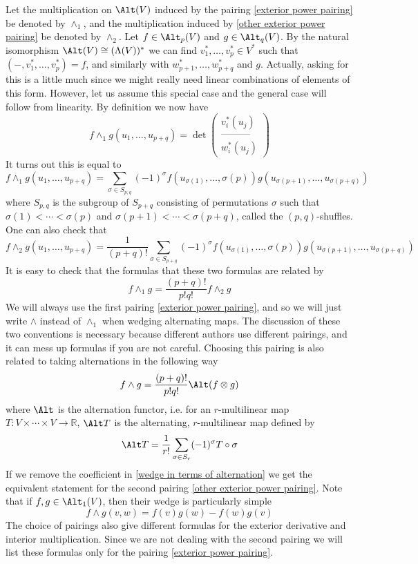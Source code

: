 Let the multiplication on $\Alt(V)$ induced by the pairing \eqref{exterior power pairing} be denoted by $\wedge_1$, and the multiplication induced by \eqref{other exterior power pairing} be denoted by $\wedge_2$. Let $f \in \Alt_p(V)$ and $g \in \Alt_q(V)$. By the natural isomorphism $\Alt(V) \cong (\Lambda(V))^*$ we can find $v_1^*,\ldots,v_p^* \in V^*$ such that $(-,v_1^*,\ldots,v_p^*) = f$, and similarly with $w_{p+1}^*,\ldots,w_{p+q}^*$ and $g$. Actually, asking for this is a little much since we might really need linear combinations of elements of this form. However, let us assume this special case and the general case will follow from linearity. By definition we now have
\[ f \wedge_1 g(u_1,\ldots,u_{p+q}) = \det\left( \begin{array}{c} v_i^*(u_j) \\ \text{---------} \\ w_i^*(u_j) \end{array} \right) \]
It turns out this is equal to 
\[ f \wedge_1 g(u_1,\ldots,u_{p+q}) = \sum_{\sigma \in S_{p,q}} (-1)^\sigma f(u_{\sigma(1)},\ldots,\sigma(p)) g(u_{\sigma(p+1)},\ldots,u_{\sigma(p+q)}) \]
where $S_{p,q}$ is the subgroup of $S_{p+q}$ consisting of permutations $\sigma$ such that $\sigma(1)<\cdots<\sigma(p)$ and $\sigma(p+1)<\cdots<\sigma(p+q)$, called the $(p,q)$-shuffles. One can also check that
\[ f \wedge_2 g(u_1,\ldots,u_{p+q}) = \frac{1}{(p+q)!} \sum_{\sigma \in S_{p+q}} (-1)^\sigma f(u_{\sigma(1)},\ldots,\sigma(p)) g(u_{\sigma(p+1)},\ldots,u_{\sigma(p+q)}) \]
It is easy to check that the formulas that these two formulas are related by
\[ f \wedge_1 g = \frac{(p+q)!}{p! q!} f \wedge_2 g \]
We will always use the first pairing \eqref{exterior power pairing}, and so we will just write $\wedge$ instead of $\wedge_1$ when wedging alternating maps. The discussion of these two conventions is necessary because different authors use different pairings, and it can mess up formulas if you are not careful. Choosing this pairing is also related to taking alternations in the following way
\begin{equation}
\label{wedge in terms of alternation}
f \wedge g = \frac{(p+q)!}{p!q!} \Alt(f \otimes g)
\end{equation}
where $\Alt$ is the alternation functor, i.e. for an $r$-multilinear map $T : V \times \cdots \times V \rightarrow \mathbb R$, $\Alt T$ is the alternating, $r$-multilinear map defined by
\[ \Alt T = \frac{1}{r!} \sum_{\sigma \in S_r} (-1)^\sigma T \circ \sigma \]
If we remove the coefficient in \eqref{wedge in terms of alternation} we get the equivalent statement for the second pairing \eqref{other exterior power pairing}. Note that if $f,g \in \Alt_1(V)$, then their wedge is particularly simple
\begin{equation}
\label{simple formula for wedge of 1-forms}
f \wedge g(v,w) = f(v)g(w) - f(w)g(v)
\end{equation}
The choice of pairings also give different formulas for the exterior derivative and interior multiplication. Since we are not dealing with the second pairing we will list these formulas only for the pairing \eqref{exterior power pairing}. 



